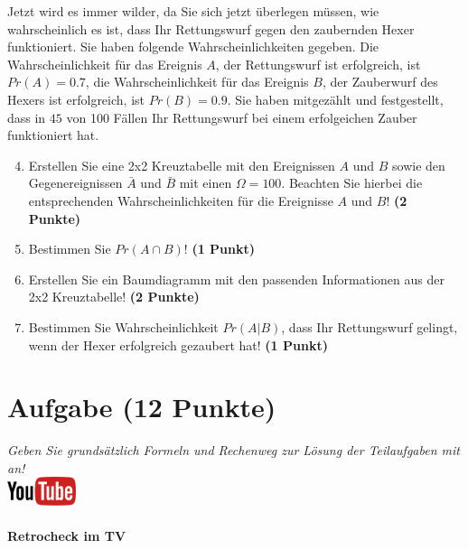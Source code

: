 \documentclass[a4paper, 9pt]{scrartcl}\usepackage[]{graphicx}\usepackage[]{xcolor}
\begin{document}
Jetzt wird es immer wilder, da Sie sich jetzt {\"u}berlegen m{\"u}ssen, wie
wahrscheinlich es ist, dass Ihr Rettungswurf gegen den zaubernden Hexer
funktioniert. Sie haben folgende Wahrscheinlichkeiten gegeben. Die
Wahrscheinlichkeit f{\"u}r das Ereignis $A$, der Rettungswurf ist erfolgreich,
ist $Pr(A) = 0.7$, die Wahrscheinlichkeit f{\"u}r das Ereignis $B$,
der Zauberwurf des Hexers ist erfolgreich, ist $Pr(B) = 0.9$. Sie
haben mitgez{\"a}hlt und festgestellt, dass in $45$ von 100 F{\"a}llen
Ihr Rettungswurf bei einem erfolgeichen Zauber funktioniert hat.  

\begin{enumerate}
  \setcounter{enumi}{3}
\item Erstellen Sie eine 2x2 Kreuztabelle mit den Ereignissen $A$ und $B$
  sowie den Gegenereignissen $\bar{A}$ und $\bar{B}$ mit einen
  $\Omega = 100$. Beachten Sie hierbei die entsprechenden
  Wahrscheinlichkeiten f{\"u}r die Ereignisse $A$ und $B$! \textbf{(2 Punkte)}
\item Bestimmen Sie $Pr(A \cap B)$! \textbf{(1 Punkt)}
\item Erstellen Sie ein Baumdiagramm mit den passenden Informationen aus der 2x2
  Kreuztabelle! \textbf{(2 Punkte)}
\item Bestimmen Sie Wahrscheinlichkeit $Pr(A|B)$, dass Ihr Rettungswurf gelingt, wenn
  der Hexer erfolgreich gezaubert hat! \textbf{(1 Punkt)}
\end{enumerate}

  
\clearpage

\section{Aufgabe \hfill (12 Punkte)}

\textit{Geben Sie grunds{\"a}tzlich Formeln und Rechenweg zur L{\"o}sung der
  Teilaufgaben mit an!} \\[1Ex]

\hfill\href{https://youtu.be/9DQKaXdxT_g}{\includegraphics[width =
  2cm]{img/youtube}} %
\hspace{2Ex}

\paragraph{Retrocheck im TV}
\end{document}
